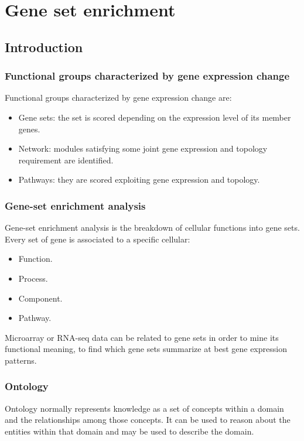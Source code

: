 \graphicspath{{chapters/06/images/}}
\chapter{Gene set enrichment}

\section{Introduction}

	\subsection{Functional groups characterized by gene expression change}
	Functional groups characterized by gene expression change are:

	\begin{multicols}{2}
		\begin{itemize}
			\item Gene sets: the set is scored depending on the expression level of its member genes.
			\item Network: modules satisfying some joint gene expression and topology requirement are identified.
			\item Pathways: they are scored exploiting gene expression and topology.
		\end{itemize}
	\end{multicols}

	\subsection{Gene-set enrichment analysis}
	Gene-set enrichment analysis is the breakdown of cellular functions into gene sets.
	Every set of gene is associated to a specific cellular:

	\begin{multicols}{4}
		\begin{itemize}
			\item Function.
			\item Process.
			\item Component.
			\item Pathway.
		\end{itemize}
	\end{multicols}

	Microarray or RNA-seq data can be related to gene sets in order to mine its functional meaning, to find which gene sets summarize at best gene expression patterns.

	\subsection{Ontology}
	Ontology normally represents knowledge as a set of concepts within a domain and the relationships among those concepts.
	It can be used to reason about the entities within that domain and may be used to describe the domain.

